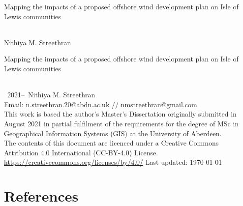 \documentclass[twoside,12pt,openany]{book}
\def\theauthor{Nithiya M. Streethran}
\def\thetitle{%
  Mapping the impacts of a proposed offshore wind development plan on
  Isle of Lewis communities%
}
\begin{document}

\frontmatter

\begin{titlepage}
  \hspace{0pt}\vfill %
  \centering %
  \Large\thetitle
  \\[4cm]
  \large\theauthor %
  \vfill\hspace{0pt} %
\end{titlepage}

{%
  \setlength{\parindent}{0pt}
  \hspace{0pt}\vfill
  \thetitle
  \\[.5cm]
  \textcopyright~2021--\the\year{}~\theauthor
  \\[.5cm]
  Email: n.streethran.20@abdn.ac.uk // nmstreethran@gmail.com
  \\[.5cm]
  This work is based the author's Master's Dissertation originally
  submitted in August 2021 in partial fulfilment of the requirements for the
  degree of MSc in Geographical Information Systems (GIS) at the University of
  Aberdeen.
  \\[.5cm]
  The contents of this document are licenced under a Creative Commons
  Attribution 4.0 International (CC-BY-4.0) License. \\
  \url{https://creativecommons.org/licenses/by/4.0/}
  \vfill
  Last updated: \today
  \vfill\hspace{0pt}
}

\doublespacing



\tableofcontents
\listoffigures
\listoftables
\printglossaries



\themainmatter








{%
  \backmatter%
  \chapter{References}%
  \printbibliography[category=cited,heading=none]%
}

\nocite{*}
\theappendix


\end{document}
